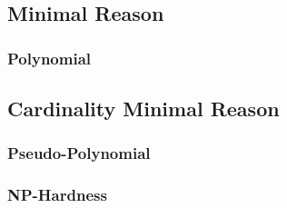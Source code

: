 \subsection{Minimal Reason}
\subsubsection{Polynomial}
\subsection{Cardinality Minimal Reason}
\subsubsection{Pseudo-Polynomial}
\subsubsection{NP-Hardness}
\label{subsubsection:hardness}

